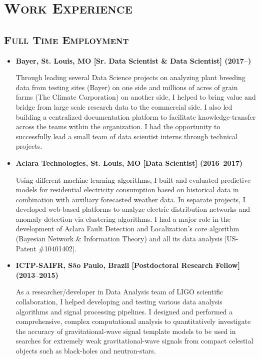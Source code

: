 \documentclass[10pt,a4paper]{moderncv}
\begin{document}
\section{\textsc{Work Experience}}
\subsection{\textsc{Full Time Employment}}

\begin{itemize}
\item \textbf{Bayer, St. Louis, MO [Sr. Data Scientist \& Data Scientist] (2017--)}

Through leading several Data Science projects on analyzing plant breeding data from testing sites (Bayer) on one side and millions of acres of grain farms (The Climate Corporation) on another side, I helped to bring value and bridge from large scale research data to the commercial side. I also led building a centralized documentation platform to facilitate knowledge-transfer across the teams within the organization. I had the opportunity to successfully lead a small team of data scientist interns through technical projects.
\vspace{.2cm}

\item \textbf{Aclara Technologies, St. Louis, MO [Data Scientist] (2016--2017)}

Using different machine learning algorithms, I built and evaluated predictive models for residential electricity consumption based on historical data in combination with auxiliary forecasted weather data. In separate projects, I developed web-based platforms to analyze electric distribution networks and anomaly detection via clustering algorithms. I had a major role in the development of Aclara Fault Detection and Localization's core algorithm (Bayesian Network \& Information Theory) and all its data analysis [US-Patent \#10401402].
\vspace{.2cm}

\item \textbf{ICTP-SAIFR, S\~{a}o Paulo, Brazil [Postdoctoral Research Fellow] (2013--2015)}

As a researcher/developer in Data Analysis team of LIGO scientific collaboration, I helped developing and testing various data analysis algorithms and signal processing pipelines. I designed and performed a comprehensive, complex computational analysis to quantitatively investigate the accuracy of gravitational-wave signal template models to be used in searches for extremely weak gravitational-wave signals from compact celestial objects such as black-holes and neutron-stars.


\end{itemize}
\end{document}
